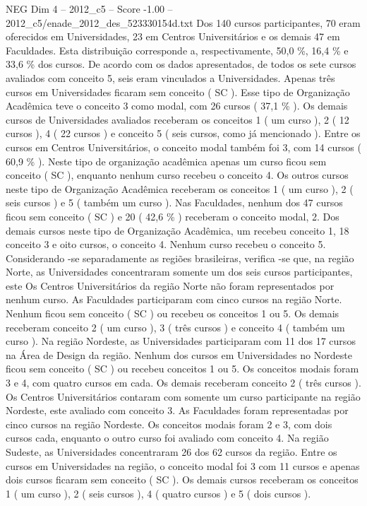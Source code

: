 \begin{textsample}{NEG Dim 4 – 2012\_c5 – Score -1.00 – 2012\_c5/enade\_2012\_des\_523330154d.txt}
Dos 140 cursos participantes, 70 eram oferecidos em Universidades, 23 em Centros Universitários e os demais 47 em Faculdades.
Esta distribuição corresponde a, respectivamente, 50,0 \%, 16,4 \% e 33,6 \% dos cursos.
De acordo com os dados apresentados, de todos os sete cursos avaliados com conceito 5, seis eram vinculados a Universidades.
Apenas três cursos em Universidades ficaram sem conceito ( SC ).
Esse tipo de Organização Acadêmica teve o conceito 3 como modal, com 26 cursos ( 37,1 \% ).
Os demais cursos de Universidades avaliados receberam os conceitos 1 ( um curso ), 2 ( 12 cursos ), 4 ( 22 cursos ) e conceito 5 ( seis cursos, como já mencionado ).
Entre os cursos em Centros Universitários, o conceito modal também foi 3, com 14 cursos ( 60,9 \% ).
Neste tipo de organização acadêmica apenas um curso ficou sem conceito ( SC ), enquanto nenhum curso recebeu o conceito 4.
Os outros cursos neste tipo de Organização Acadêmica receberam os conceitos 1 ( um curso ), 2 ( seis cursos ) e 5 ( também um curso ).
Nas Faculdades, nenhum dos 47 cursos ficou sem conceito ( SC ) e 20 ( 42,6 \% ) receberam o conceito modal, 2.
Dos demais cursos neste tipo de Organização Acadêmica, um recebeu conceito 1, 18 conceito 3 e oito cursos, o conceito 4.
Nenhum curso recebeu o conceito 5.
Considerando -se separadamente as regiões brasileiras, verifica -se que, na região Norte, as Universidades concentraram somente um dos seis cursos participantes, este Os Centros Universitários da região Norte não foram representados por nenhum curso.
As Faculdades participaram com cinco cursos na região Norte.
Nenhum ficou sem conceito ( SC ) ou recebeu os conceitos 1 ou 5.
Os demais receberam conceito 2 ( um curso ), 3 ( três cursos ) e conceito 4 ( também um curso ).
Na região Nordeste, as Universidades participaram com 11 dos 17 cursos na Área de Design da região.
Nenhum dos cursos em Universidades no Nordeste ficou sem conceito ( SC ) ou recebeu conceitos 1 ou 5.
Os conceitos modais foram 3 e 4, com quatro cursos em cada.
Os demais receberam conceito 2 ( três cursos ).
Os Centros Universitários contaram com somente um curso participante na região Nordeste, este avaliado com conceito 3.
As Faculdades foram representadas por cinco cursos na região Nordeste.
Os conceitos modais foram 2 e 3, com dois cursos cada, enquanto o outro curso foi avaliado com conceito 4.
Na região Sudeste, as Universidades concentraram 26 dos 62 cursos da região.
Entre os cursos em Universidades na região, o conceito modal foi 3 com 11 cursos e apenas dois cursos ficaram sem conceito ( SC ).
Os demais cursos receberam os conceitos 1 ( um curso ), 2 ( seis cursos ), 4 ( quatro cursos ) e 5 ( dois cursos ).

\end{textsample}
